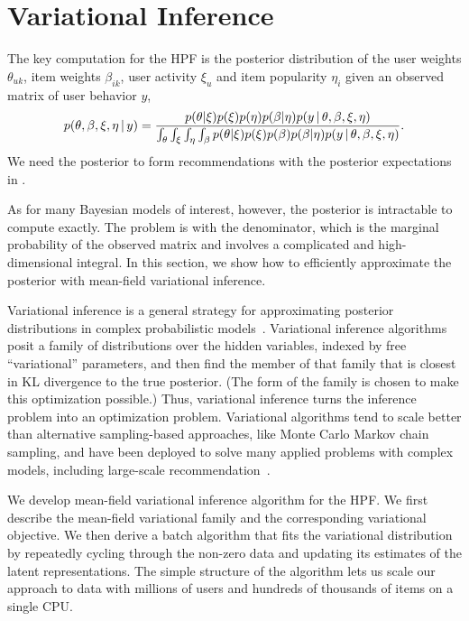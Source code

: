 \section{Variational Inference}
\label{sec:inference}

The key computation for the HPF is the posterior distribution of the
user weights $\theta_{uk}$, item weights $\beta_{ik}$, user activity
$\xi_{u}$ and item popularity $\eta_i$ given an observed matrix
of user behavior $y$,
\begin{equation*}
  p(\theta, \beta, \xi, \eta \,\vert\, y) = \frac{p(\theta | \xi) p(\xi)
    p(\eta) p(\beta | \eta) p(y \,\vert\, \theta, \beta, \xi, \eta)}
  {\int_{\theta} \int_{\xi} \int_{\eta} \int_{\beta} p(\theta |
    \xi) p(\xi) p(\beta) p(\beta | \eta) p(y \,\vert\, \theta, \beta, \xi, \eta)}.
\end{equation*}
We need the posterior to form recommendations with the posterior
expectations in .

As for many Bayesian models of interest, however, the posterior is
intractable to compute exactly.  The problem is with the denominator,
which is the marginal probability of the observed matrix and involves
a complicated and high-dimensional integral.  In this section, we show
how to efficiently approximate the posterior with mean-field
variational inference.

Variational inference is a general strategy for approximating
posterior distributions in complex probabilistic
models~\cite{Jordan:1999,Wainwright:2008}.  Variational inference
algorithms posit a family of distributions over the hidden variables,
indexed by free ``variational'' parameters, and then find the member
of that family that is closest in KL divergence to the true posterior.
(The form of the family is chosen to make this optimization possible.)
Thus, variational inference turns the inference problem into an
optimization problem.  Variational algorithms tend to scale better
than alternative sampling-based approaches, like Monte Carlo Markov
chain sampling, and have been deployed to solve many applied problems
with complex models, including large-scale recommendation~\cite{Paquet:2013p9197}.

We develop mean-field variational inference algorithm for the HPF.  We
first describe the mean-field variational family and the corresponding
variational objective.  We then derive a batch algorithm that fits the
variational distribution by repeatedly cycling through the non-zero
data and updating its estimates of the latent representations. The
simple structure of the algorithm lets us scale our approach to data
with millions of users and hundreds of thousands of items on a single
CPU.

